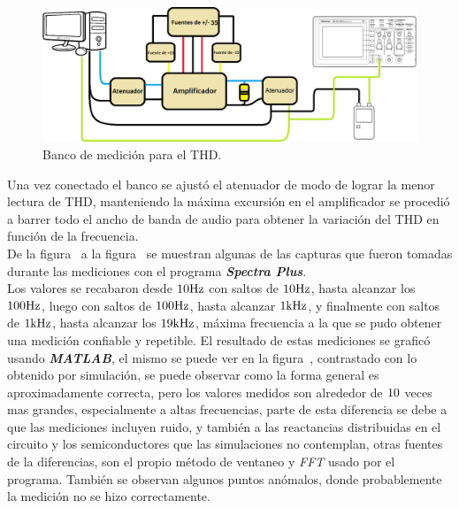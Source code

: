 \begin{figure}[H]
    \centering
    \includegraphics[width= 0.8 \textwidth]{./img/bancos/banco_THD.png}
    \caption{Banco de medición para el THD.}
    \label{fig:banco_THD}
\end{figure}



Una vez conectado el banco se ajustó el atenuador de modo de lograr la menor lectura de THD, manteniendo la máxima excursión en el amplificador se procedió a barrer todo el ancho de banda de audio para obtener la variación del THD en función de la frecuencia.\\
De la figura~ a la figura~ se muestran algunas de las capturas que fueron tomadas durante las mediciones con el programa \textbf{\textit{Spectra Plus}}.\\
Los valores se recabaron desde $10 \si[per-mode=symbol]{\hertz}$ con saltos de $10 \si[per-mode=symbol]{\hertz}$, hasta alcanzar los $100 \si[per-mode=symbol]{\hertz}$, luego con saltos de $100 \si[per-mode=symbol]{\hertz}$, hasta alcanzar $1 \si[per-mode=symbol]{\kilo\hertz}$, y finalmente con saltos de $1 \si[per-mode=symbol]{\kilo\hertz}$, hasta alcanzar los $19 \si[per-mode=symbol]{\kilo\hertz}$, máxima frecuencia a la que se pudo obtener una medición confiable y repetible. El resultado de estas mediciones se graficó usando \textbf{\textit{MATLAB}}, el mismo se puede ver en la figura~, contrastado con lo obtenido por simulación, se puede observar como la forma general es aproximadamente correcta, pero los valores medidos son alrededor de $\num 10$ veces mas grandes, especialmente a altas frecuencias, parte de esta diferencia se debe a que las mediciones incluyen ruido, y también a las reactancias distribuidas en el circuito y los semiconductores que las simulaciones no contemplan, otras fuentes de la diferencias, son el propio método de ventaneo y \textit{FFT} usado por el programa. También se observan algunos puntos anómalos, donde probablemente la medición no se hizo correctamente.\\


